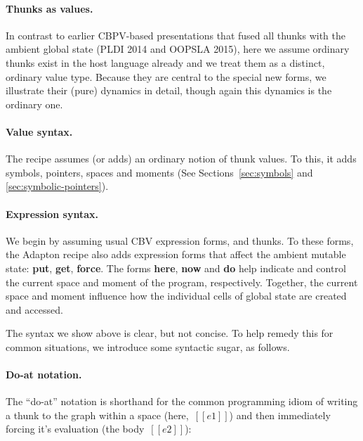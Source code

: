 \documentclass[11pt]{article}
\begin{document}
\paragraph{Thunks as values.}
In contrast to earlier CBPV-based presentations that fused all thunks
with the ambient global state (PLDI 2014 and OOPSLA 2015), here we
assume ordinary thunks exist in the host language already and we treat
them as a distinct, ordinary value type.
%
Because they are central to the special new forms, we illustrate their
(pure) dynamics in detail, though again this dynamics is the ordinary one.

\paragraph{Value syntax.}
The recipe assumes (or adds) an ordinary notion of thunk values.
%
To this, it adds symbols, pointers, spaces and moments (See Sections~\ref{sec:symbols} and \ref{sec:symbolic-pointers}).

\ottgrammartabular{
  \ottv
}

\paragraph{Expression syntax.}

We begin by assuming usual CBV expression forms, and thunks.
%
To these forms, the Adapton recipe also adds expression forms that
affect the ambient mutable state: \textbf{put}, \textbf{get}, \textbf{force}.
%
The forms \textbf{here}, \textbf{now} and \textbf{do} help indicate
and control the current space and moment of the program, respectively.
%
Together, the current space and moment influence how the individual
cells of global state are created and accessed.

\ottgrammartabular{
  \otte
}

\ottgrammartabular{
  \ottC
  \\
  \ottCxtVerb
  \\
  \ottCxtDim
}  

\noindent
The syntax we show above is clear, but not concise.
%
To help remedy this for common situations, we introduce some syntactic sugar, as follows.

\paragraph{Do-at notation.}

The ``do-at'' notation is shorthand for the common programming idiom
of writing a thunk to the graph within a space (here,~$[[e1]]$) and then
immediately forcing it's evaluation (the body~$[[e2]]$):
\end{document}
